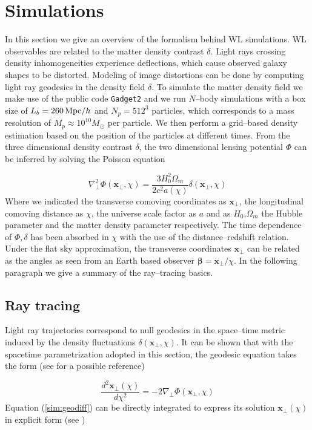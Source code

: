 \documentclass[reprint,aps,prd,superscriptaddress,showkeys,showpacs]{revtex4-1}
\newcommand{\bb}[1]{\mathbf{#1}}
\newcommand{\ttt}[1]{\texttt{#1}}
\begin{document}
\section{Simulations}
% 
In this section we give an overview of the formalism behind WL simulations. WL observables are related to the matter density contrast $\delta$. Light rays crossing density inhomogeneities experience deflections, which cause observed galaxy shapes to be distorted. Modeling of image distortions can be done by computing light ray geodesics in the density field $\delta$. To simulate the matter density field we make use of the public code \ttt{Gadget2} \citep{Gadget2} and we run $N$--body simulations with a box size of $L_b=260\,{\rm Mpc}/h$ and $N_p=512^3$ particles, which corresponds to a mass resolution of $M_p\approx 10^{10}M_\odot$ per particle. We then perform a grid--based density estimation based on the position of the particles at different times. From the three dimensional density contrast $\delta$, the two dimensional lensing potential $\Phi$ can be inferred by solving the Poisson equation 

\begin{equation}
\label{sim:poisson}
\nabla_\perp^2\Phi(\bb{x}_\perp,\chi) = \frac{3H_0^2\Omega_m}{2c^2a(\chi)} \delta(\bb{x}_\perp,\chi)
\end{equation} 
%
Where we indicated the transverse comoving coordinates as $\bb{x}_\perp$, the longitudinal comoving distance as $\chi$, the universe scale factor as $a$ and as $H_0$,$\Omega_m$ the Hubble parameter and the matter density parameter respectively. The time dependence of $\Phi,\delta$ has been absorbed in $\chi$ with the use of the distance--redshift relation. Under the flat sky approximation, the transverse coordinates $\bb{x}_\perp$ can be related as the angles as seen from an Earth based observer $\pmb{\beta}=\bb{x}_\perp/\chi$. In the following paragraph we give a summary of the ray--tracing basics.   

\subsection{Ray tracing}
Light ray trajectories correspond to null geodesics in the space--time metric induced by the density fluctuations $\delta(\bb{x}_\perp,\chi)$. It can be shown that with the spacetime parametrization adopted in this section, the geodesic equation takes the form (see \citep{BornFlexion} for a possible reference)

\begin{equation}
\label{sim:geodiff}
\frac{d^2 \bb{x}_\perp(\chi)}{d\chi^2} = -2\nabla_\perp \Phi(\bb{x}_\perp,\chi)
\end{equation}
%
Equation (\ref{sim:geodiff}) can be directly integrated to express its solution $\bb{x}_\perp(\chi)$ in explicit form (see \citep{DodelsonWL}) 
\end{document}
